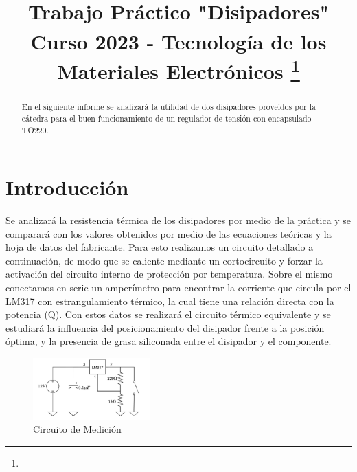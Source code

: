 \documentclass[conference]{IEEEtran}
\begin{document}
\title{Trabajo Práctico "Disipadores"\\
{\footnotesize \textsuperscript{}Curso 2023 - Tecnología de los Materiales Electrónicos}
\thanks{}
}

\author{
\and
{}
}

\maketitle


\begin{abstract}
En el siguiente informe se analizará la utilidad de dos disipadores proveídos por la cátedra
para el buen funcionamiento de un regulador de tensión con encapsulado TO220.
\end{abstract}

\section{Introducción}
Se analizará la resistencia térmica de los disipadores por medio de la práctica y se comparará con los valores 
obtenidos por medio de las ecuaciones teóricas y la hoja de datos del fabricante. Para esto realizamos un
circuito detallado a continuación, de modo que se caliente mediante un cortocircuito 
y forzar la activación del circuito interno de protección por temperatura. Sobre el mismo conectamos en 
serie un amperímetro para encontrar la corriente que circula por el LM317 con estrangulamiento térmico, la 
cual tiene una relación directa con la potencia (Q).
Con estos datos se realizará el circuito térmico equivalente y se estudiará la influencia del posicionamiento
del disipador frente a la posición óptima, y la presencia de grasa siliconada entre el disipador y el componente.
\begin{figure}[h]
    \centering
    \includegraphics[width=0.4\textwidth]{CircuitoDeMedicion.png}
    \caption{Circuito de Medición}
\end{figure}
\end{document}
